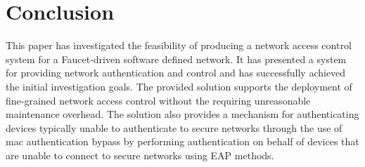 \chapter{Conclusion}
This paper has investigated the feasibility of producing a network access control system for a Faucet-driven software defined network.
It has presented a system for providing network authentication and control and has successfully achieved the initial investigation goals.
The provided solution supports the deployment of fine-grained network access control without the requiring unreasonable maintenance overhead.
The solution also provides a mechanism for authenticating devices typically unable to authenticate to secure networks through the use of  mac authentication bypass by performing authentication on behalf of devices that are unable to connect to secure networks using EAP methods.